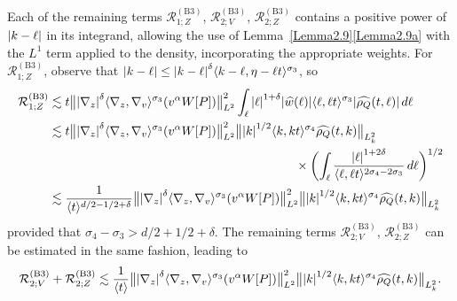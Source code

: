 \documentclass[JEP,XML,SOM,Unicode]{cedram}
\newcommand{\bnorm}[1]{\bigl\|#1\bigr\|}
\theoremstyle{plain}
\theoremstyle{remark}
\newcommand{\bbbr}[1]{\biggl(#1 \biggr)}
\newcommand{\ak}{\abs{k}}
\newcommand{\jb}[1]{\langle#1\rangle}
\begin{document}
Each of the remaining terms $\mathcal{R}_{1;Z}^{\mathrm{(B3)}}$, $\mathcal{R}_{2;V}^{\mathrm{(B3)}}$, $\mathcal{R}_{2;Z}^{\mathrm{(B3)}}$ contains a positive power of $\abs{k-\ell }$ in its integrand, allowing the use of Lemma~\ref{Lemma2.9}\eqref{Lemma2.9a} with the $L^1$ term applied to the density, incorporating the appropriate weights. For $\mathcal{R}_{1;Z}^{\mathrm{(B3)}}$, observe that $\abs{k-\ell }\leq\abs{k-\ell }^{\delta}\jb{k-\ell ,\eta-\ell t}^{\sigma_3}$, so
\begin{align*}
\mathcal{R}_{1;Z}^{\mathrm{(B3)}}&\lesssim t\bnorm{\abs{\nabla_z}^\delta\jb{\nabla_z,\nabla_v}^{\sigma_3}(v^\alpha W[P])}_{L^2}^2\int_\ell \abs{\ell }^{1+\delta}\abs{\widehat w(\ell )}\jb{\ell ,\ell t}^{\sigma_3}\abs{\widehat{\rho_Q}(t,\ell )}\,d\ell \\
&\lesssim t\bnorm{\abs{\nabla_z}^\delta\jb{\nabla_z,\nabla_v}^{\sigma_3}(v^\alpha W[P])}_{L^2}^2\bnorm{\ak^{1/2}\jb{k,kt}^{\sigma_4}\widehat{\rho_Q}(t,k)}_{L^2_k}\\
&\hspace*{7cm}\times\bbbr{\int_\ell \frac{\abs{\ell }^{1+2\delta}}{\jb{\ell ,\ell t}^{2\sigma_4-2\sigma_3}}\,d\ell }^{1/2}\\
&\lesssim\frac{1}{\jb{t}^{{d/2}-1/2+\delta}}\bnorm{\abs{\nabla_z}^\delta\jb{\nabla_z,\nabla_v}^{\sigma_3}(v^\alpha W[P])}_{L^2}^2\bnorm{\ak^{1/2}\jb{k,kt}^{\sigma_4}\widehat{\rho_Q}(t,k)}_{L^2_k}
\end{align*}
provided that $\sigma_4-\sigma_3>d/2+1/2+\delta$.
The remaining terms $\mathcal{R}_{2;V}^{\mathrm{(B3)}}$, $\mathcal{R}_{2;Z}^{\mathrm{(B3)}}$ can be estimated in the same fashion, leading to
\begin{align*}
\mathcal{R}_{2;V}^{\mathrm{(B3)}}+\mathcal{R}_{2;Z}^{\mathrm{(B3)}}\lesssim\frac{1}{\jb{t}}\bnorm{\abs{\nabla_z}^\delta\jb{\nabla_z,\nabla_v}^{\sigma_3}(v^\alpha W[P])}_{L^2}^2\bnorm{\ak^{1/2}\jb{k,kt}^{\sigma_4}\widehat{\rho_Q}(t,k)}_{L^2_k}.
\end{align*}
\end{document}
